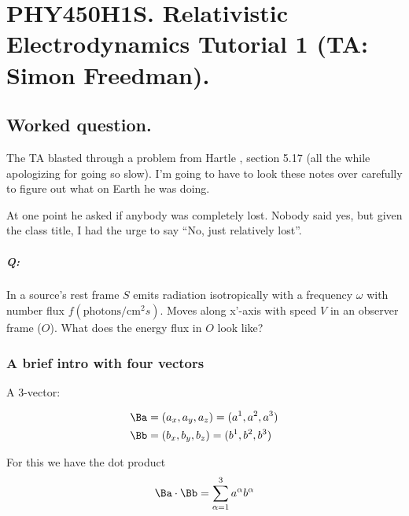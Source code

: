 
%

\chapter{PHY450H1S.  Relativistic Electrodynamics Tutorial 1 (TA: Simon Freedman).}
\label{chap:relativisticElectrodynamicsT1}
{}
\date{Jan 20, 2011}

\beginArtNoToc

\section{Worked question.}

The TA blasted through a problem from Hartle \cite{hartle2003gravity}, section 5.17 (all the while apologizing for going so slow).  I'm going to have to look these notes over carefully to figure out what on Earth he was doing.

At one point he asked if anybody was completely lost.  Nobody said yes, but given the class title, I had the urge to say ``No, just relatively lost''.

\paragraph{Q:}
In a source's rest frame $S$ emits radiation isotropically with a frequency $\omega$ with number flux $f(\text{photons}/\text{cm}^2 s)$.  Moves along x'-axis with speed $V$ in an observer frame ($O$).  What does the energy flux in $O$ look like?

\subsection{A brief intro with four vectors}

A 3-vector: 

\begin{align}\label{eqn:relativisticElectrodynamicsT1:10}
\Ba &= (a_x, a_y, a_z) = (a^1, a^2, a^3) \\
\Bb &= (b_x, b_y, b_z) = (b^1, b^2, b^3)
\end{align}

For this we have the dot product
\begin{equation}\label{eqn:relativisticElectrodynamicsT1:20}
\Ba \cdot \Bb = \sum_{\alpha=1}^3 a^\alpha b^\alpha
\end{equation}

